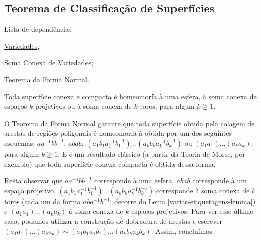 \subsection{Teorema de Classificação de Superfícies}
\label{classificacao-superficies-thm}
\begin{titlemize}{Lista de dependências}
	\item \hyperref[variedade-def]{Variedades};\\
    \item \hyperref[soma-conexa-def]{Soma Conexa de Variedades};\\
	\item \hyperref[forma-normal-thm]{Teorema da Forma Normal}.
\end{titlemize}

\begin{thm}
    Toda superfície conexa e compacta é homeomorfa à uma esfera, à soma conexa de espaços $k$ projetivos ou à soma conexa de $k$ toros, para algum $k\geq 1$.

    \begin{dem}
        O Teorema da Forma Normal garante que toda superfície obtida pela colagem de arestas de regiões poligonais é homeomorfa à obtida por um dos seguintes esquemas: $aa^{-1}bb^{-1}$, $abab$, $(a_1 b_1 a_1^{-1} b_1^{-1})\ldots (a_k b_k a_k^{-1} b_k^{-1})$ ou $(a_1 a_1)\ldots (a_k a_k)$, para algum $k\geq 1$. E é um resultado clássico (a partir da Teoria de Morse, por exemplo) que toda superfície conexa compacta é obtida dessa forma.

        Resta observar que $aa^{-1}bb^{-1}$ corresponde à uma esfera, $abab$ corresponde à um espaço projetivo, $(a_1 b_1 a_1^{-1} b_1^{-1})\ldots (a_k b_k a_k^{-1} b_k^{-1})$ corresponde à soma conexa de $k$ toros (cada um da forma $aba^{-1}b^{-1}$; decorre do Lema \ref{varias-etiquetagens-lemma}) e $(a_1 a_1)\ldots (a_k a_k)$ à soma conexa de $k$ espaços projetivos. Para ver esse último caso, podemos utilizar a construção de dobradura de arestas e escrever $(a_1 a_1)\ldots (a_k a_k) \sim (a_1 b_1 a_1 b_1)\ldots (a_k b_k a_k b_k)$. Assim, concluímos.
    \end{dem}
\end{thm}

